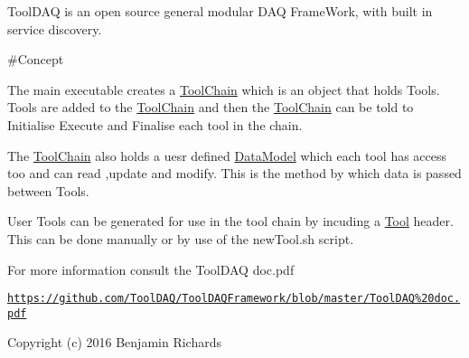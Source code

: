 Tool\-D\-A\-Q is an open source general modular D\-A\-Q Frame\-Work, with built in service discovery.



 \#\-Concept 



The main executable creates a \hyperlink{classToolChain}{Tool\-Chain} which is an object that holds Tools. Tools are added to the \hyperlink{classToolChain}{Tool\-Chain} and then the \hyperlink{classToolChain}{Tool\-Chain} can be told to Initialise Execute and Finalise each tool in the chain.

The \hyperlink{classToolChain}{Tool\-Chain} also holds a uesr defined \hyperlink{classDataModel}{Data\-Model} which each tool has access too and can read ,update and modify. This is the method by which data is passed between Tools.

User Tools can be generated for use in the tool chain by incuding a \hyperlink{classTool}{Tool} header. This can be done manually or by use of the new\-Tool.\-sh script.

For more information consult the Tool\-D\-A\-Q doc.\-pdf

\href{https://github.com/ToolDAQ/ToolDAQFramework/blob/master/ToolDAQ%20doc.pdf}{\tt https\-://github.\-com/\-Tool\-D\-A\-Q/\-Tool\-D\-A\-Q\-Framework/blob/master/\-Tool\-D\-A\-Q\%20doc.\-pdf}

Copyright (c) 2016 Benjamin Richards 